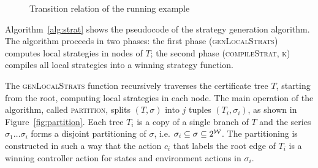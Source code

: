 \begin{figure}
    \centering
    \caption{Transition relation of the running example}
    \label{fig:stratExample}
\end{figure}

Algorithm~\ref{alg:strat} shows the pseudocode of the strategy generation algorithm.  The algorithm proceeds in two phases: the first phase (\textsc{genLocalStrats}) computes local strategies in nodes of $T$; the second phase (\textsc{compileStrat, k}) compiles all local strategies into a winning strategy function.

The \textsc{genLocalStrats} function recursively traverses the certificate tree $T$, starting from the root, computing local strategies in each node.  The main operation of the algorithm, called \textsc{partition}, splits $(T, \sigma)$ into $j$ tuples $(T_i, \sigma_i)$, as shown in Figure~\ref{fig:partition}.  Each tree $T_i$ is a copy of a single branch of $T$ and the series $\sigma_1 \ldots \sigma_i$ forms a disjoint partitioning of $\sigma$, i.e. $\sigma_i \subseteq \sigma \subseteq 2^{\mathcal{W}}$.  The partitioning is constructed in such a way that the action $c_i$ that labels the root edge of $T_i$ is a winning controller action for states and environment actions in $\sigma_i$.

